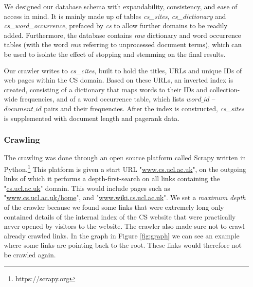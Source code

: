 We designed our database schema with expandability, consistency, and ease of access in mind. It is mainly made up of tables \emph{cs\_sites}, \emph{cs\_dictionary} and \emph{cs\_word\_occurrence}, prefaced by \emph{cs} to allow further domains to be readily added. Furthermore, the database contains \emph{raw} dictionary and word occurrence tables (with the word \emph{raw} referring to unprocessed document terms), which can be used to isolate the effect of stopping and stemming on the final results.

Our crawler writes to \emph{cs\_cites}, built to hold the titles, URLs and unique IDs of web pages within the CS domain.
Based on these URLs, an inverted index is created, consisting of a dictionary that maps words to their IDs and collection-wide frequencies, and of a word occurrence table, which lists $word\_id$ -- $document\_id$ pairs and their frequencies. After the index is constructed, \emph{cs\_sites} is supplemented with document length and pagerank data.


\subsubsection{Crawling} %
\label{ssub:crawling}

The crawling was done through an open source platform called Scrapy written in Python.\footnote{https://scrapy.org} This platform is given a start URL "\url{www.cs.ucl.ac.uk}", on the outgoing links of which it performs a depth-first-search on all links containing the "\url{cs.ucl.ac.uk}" domain. This would include pages such as "\url{www.cs.ucl.ac.uk/home}", and "\url{www.wiki.cs.ucl.ac.uk}". We set a \emph{maximum depth} of the crawler because we found some links that were extremely long only contained details of the internal index of the CS website that were practically never opened by visitors to the website. The crawler also made sure not to crawl already crawled links. In the graph in Figure \ref{fig:graph} we can see an example where some links are pointing back to the root. These links would therefore not be crawled again.


